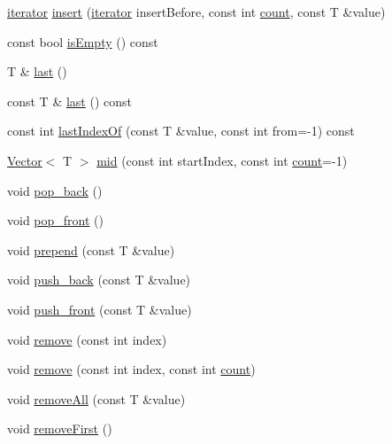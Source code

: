 \begin{DoxyCompactItemize}
\hyperlink{classprism_1_1_vector_aec3211503bad8800731cc3e08170592e}{iterator} \hyperlink{classprism_1_1_vector_a156484f2794527cb9385c54980aaf95d}{insert} (\hyperlink{classprism_1_1_vector_aec3211503bad8800731cc3e08170592e}{iterator} insert\+Before, const int \hyperlink{classprism_1_1_vector_ad40e1dc908502680797f37312dda7a4f}{count}, const T \&value)
\item 
const bool \hyperlink{classprism_1_1_vector_a23be1fddbb4bc27cabd6af5d1aa4ba91}{is\+Empty} () const 
\item 
T \& \hyperlink{classprism_1_1_vector_a89b03b8e2b66641c25f5014abb03dc03}{last} ()
\item 
const T \& \hyperlink{classprism_1_1_vector_a20f067c5cbcfb722e4e7a4983d9eca24}{last} () const 
\item 
const int \hyperlink{classprism_1_1_vector_a33e965cfc15bd23e0748dfacaeb97428}{last\+Index\+Of} (const T \&value, const int from=-\/1) const 
\item 
\hyperlink{classprism_1_1_vector}{Vector}$<$ T $>$ \hyperlink{classprism_1_1_vector_a19bd353d0943d4c6b962982e8c85a9c4}{mid} (const int start\+Index, const int \hyperlink{classprism_1_1_vector_ad40e1dc908502680797f37312dda7a4f}{count}=-\/1)
\item 
void \hyperlink{classprism_1_1_vector_a990628b9b119ddcec57715cd7541ea99}{pop\+\_\+back} ()
\item 
void \hyperlink{classprism_1_1_vector_abd9320b7ae720bb4c3500ebba3e42537}{pop\+\_\+front} ()
\item 
void \hyperlink{classprism_1_1_vector_a1438597636b56d6c9f522e719097190c}{prepend} (const T \&value)
\item 
void \hyperlink{classprism_1_1_vector_a4a920a4960f25c0aef5461eb46a2620e}{push\+\_\+back} (const T \&value)
\item 
void \hyperlink{classprism_1_1_vector_ad1f9542ba64a36ffbd10ede7cae95aef}{push\+\_\+front} (const T \&value)
\item 
void \hyperlink{classprism_1_1_vector_a5a1f891782e1bb2cba1bbe89a9b8afc7}{remove} (const int index)
\item 
void \hyperlink{classprism_1_1_vector_a2b9dcf29eefe01b99a83ec5c2189b487}{remove} (const int index, const int \hyperlink{classprism_1_1_vector_ad40e1dc908502680797f37312dda7a4f}{count})
\item 
void \hyperlink{classprism_1_1_vector_a9f44c797424ce88caf23a50486846b9d}{remove\+All} (const T \&value)
\item 
void \hyperlink{classprism_1_1_vector_a3a2287f445b6788a38a746b448f98b48}{remove\+First} ()

\end{DoxyCompactItemize}

